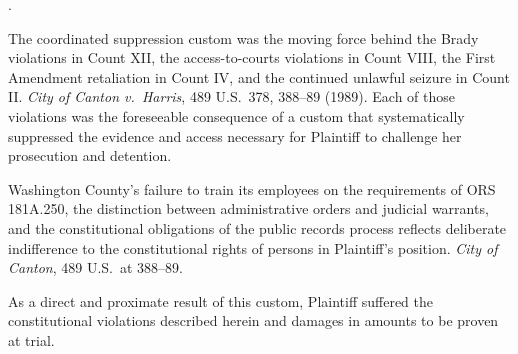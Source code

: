 \documentclass[12pt,letterpaper]{article}
\newcounter{complaintpara}
\newenvironment{paras}{%
	\begin{list}{\arabic{complaintpara}.}{%
			\setlength{\leftmargin}{0.5in}%
			\setlength{\labelwidth}{0.4in}%
			\setlength{\labelsep}{0.1in}%
			\setlength{\itemsep}{0pt}%
			\setlength{\parsep}{0pt}%
			\setlength{\topsep}{6pt}%
		}%
	}{%
	\end{list}%
}
\begin{document}
\begin{paras}
		\item The coordinated suppression custom was the moving force
		behind the Brady violations in Count XII, the access-to-courts
		violations in Count VIII, the First Amendment retaliation in
		Count IV, and the continued unlawful seizure in Count II.
		\textit{City of Canton v.\ Harris}, 489 U.S.\ 378, 388--89
		(1989). Each of those violations was the foreseeable
		consequence of a custom that systematically suppressed the
		evidence and access necessary for Plaintiff to challenge her
		prosecution and detention.
		
		\item Washington County's failure to train its employees on
		the requirements of ORS 181A.250, the distinction between
		administrative orders and judicial warrants, and the
		constitutional obligations of the public records process
		reflects deliberate indifference to the constitutional rights
		of persons in Plaintiff's position. \textit{City of Canton},
		489 U.S.\ at 388--89.
		
		\item As a direct and proximate result of this custom,
		Plaintiff suffered the constitutional violations described
		herein and damages in amounts to be proven at trial.
		
	\end{paras}
\end{document}
